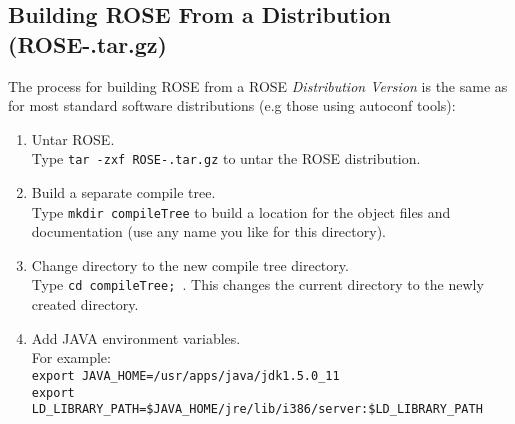 \subsection{Building ROSE From a Distribution (ROSE-\VersionNumber.tar.gz)}
\label{gettingStarted:UserInstructions}
   The process for building ROSE from a ROSE {\em Distribution Version} is the same as for
    most standard software distributions (e.g those using autoconf tools):
\begin{enumerate}
     \item Untar ROSE. \\
           Type {\tt tar -zxf ROSE-\VersionNumber.tar.gz} to untar the ROSE distribution.
     \item Build a separate compile tree. \\
           Type {\tt mkdir compileTree} to build a location for the object files and
           documentation (use any name you like for this directory).
     \item Change directory to the new compile tree directory. \\
           Type {\tt cd compileTree; }. This changes the current directory to the newly
           created directory.
     \item Add JAVA environment variables. \\
           For example:\\
           {\tt export JAVA\_HOME=/usr/apps/java/jdk1.5.0\_11} \\
        {\tt export
        LD\_LIBRARY\_PATH=\$JAVA\_HOME/jre/lib/i386/server:\$LD\_LIBRARY\_PATH}


\end{enumerate}
